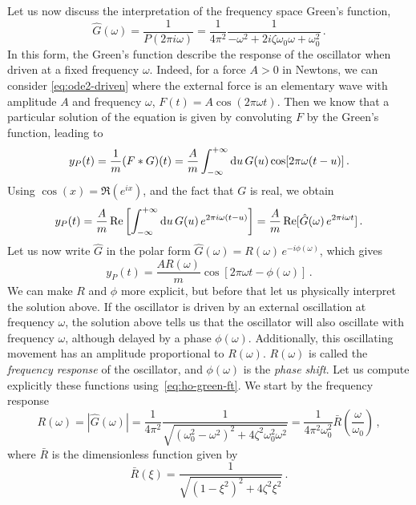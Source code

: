 Let us now discuss the interpretation of the frequency space Green's function, \ie
\begin{equation}
  \hat{G}(\omega)=\frac{1}{P(2\pi i\omega)}=\frac{1}{4\pi^2}
  \frac{1}{-\omega^2+2i\zeta\omega_0\omega+\omega_0^2}\,.
  \label{eq:ho-green-ft}
\end{equation}
In this form, the Green's function describe the response of the oscillator when driven at
a fixed frequency $\omega$. Indeed, for a force $A>0$ in Newtons, we can consider
\cref{eq:ode2-driven} where the external force is an elementary wave with amplitude $A$
and frequency $\omega$, \ie $F(t)=A\cos(2\pi\omega t)$. Then we know that a particular
solution of the equation is given by convoluting $F$ by the Green's function, leading to
\begin{equation}
  y_P(t)=\frac{1}{m}(F\ast G)(t)=\frac{A}{m}\int_{-\infty}^{+\infty}\mathrm{d}{u}\,G(u)\cos[2\pi\omega(t-u)]\,.
\end{equation}
Using $\cos(x)=\Re(e^{ix})$, and the fact that $G$ is real, we obtain
\begin{equation}
  y_P(t)=\frac{A}{m}\operatorname{Re}\left[\int_{-\infty}^{+\infty}\mathrm{d}{u}\,G(u)\,e^{2\pi i\omega(t-u)}\right]
  =\frac{A}{m}\operatorname{Re}[\hat{G}(\omega)\,e^{2\pi i\omega t}]\,.
\end{equation}
Let us now write $\hat{G}$ in the polar form
$\hat{G}(\omega)=R(\omega)\,e^{-i\phi(\omega)}$, which gives
\begin{equation}
  y_P(t)=\frac{AR(\omega)}{m}\cos[2\pi\omega t-\phi(\omega)]\,.
\end{equation}
We can make $R$ and $\phi$ more explicit, but before that let us physically interpret the
solution above. If the oscillator is driven by an external oscillation at frequency
$\omega$, the solution above tells us that the oscillator will also oscillate with
frequency $\omega$, although delayed by a phase $\phi(\omega)$. Additionally, this
oscillating movement has an amplitude proportional to $R(\omega)$. $R(\omega)$ is called
the \emph{frequency response} of the oscillator, and $\phi(\omega)$ is the \emph{phase
shift}. Let us compute explicitly these functions using~\cref{eq:ho-green-ft}. We start by
the frequency response
\begin{equation}
  R(\omega)=|\hat{G}(\omega)|=\frac{1}{4\pi^2}
  \frac{1}{\sqrt{(\omega_0^2-\omega^2)^2+4\zeta^2\omega_0^2\omega^2}}
  =\frac{1}{4\pi^2\omega_0^2}\bar{R}\left(\frac{\omega}{\omega_0}\right)\,,
\end{equation}
where $\bar{R}$ is the dimensionless function given by
\begin{equation}
  \bar{R}(\xi)=\frac{1}{\sqrt{(1-\xi^2)^2+4\zeta^2\xi^2}}\,.
  \label{eq:ho-response}
\end{equation}
